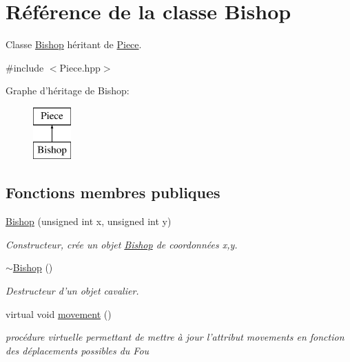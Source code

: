 \hypertarget{class_bishop}{\section{Référence de la classe Bishop}
\label{class_bishop}
}


Classe \hyperlink{class_bishop}{Bishop} héritant de \hyperlink{class_piece}{Piece}.  




{\ttfamily \#include $<$Piece.\-hpp$>$}

Graphe d'héritage de Bishop\-:\begin{figure}[H]
\begin{center}
\leavevmode
\includegraphics[height=2.000000cm]{class_bishop}
\end{center}
\end{figure}
\subsection*{Fonctions membres publiques}
\begin{DoxyCompactItemize}
\item 
\hyperlink{class_bishop_a7e73da51fcaac88ce0d16e78221142ee}{Bishop} (unsigned int x, unsigned int y)
\begin{DoxyCompactList}\small\item\em Constructeur, crée un objet \hyperlink{class_bishop}{Bishop} de coordonnées x,y. \end{DoxyCompactList}\item 
\hyperlink{class_bishop_a3705b4537a39d09a59143fe01a62442f}{$\sim$\-Bishop} ()
\begin{DoxyCompactList}\small\item\em Destructeur d'un objet cavalier. \end{DoxyCompactList}\item 
virtual void \hyperlink{class_bishop_abd25da5816a737ab64880cbaa7bd7582}{movement} ()
\begin{DoxyCompactList}\small\item\em procédure virtuelle permettant de mettre à jour l'attribut movements en fonction des déplacements possibles du Fou \end{DoxyCompactList}\end{DoxyCompactItemize}
